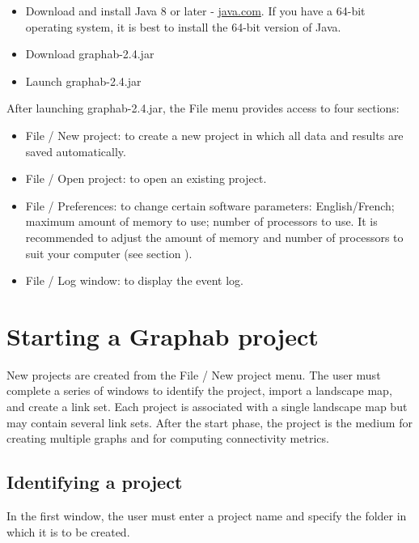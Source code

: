 \documentclass{article}
\begin{document}
\begin{itemize}
	\item Download and install Java 8 or later - \href{http://www.java.com}{java.com}. If you have a 64-bit operating system, it is best to install the 64-bit version of Java.
	\item Download graphab-2.4.jar
	\item Launch graphab-2.4.jar
\end{itemize}
After launching graphab-2.4.jar, the File menu provides access to four sections:
\begin{itemize}
	\item File / New project: to create a new project in which all data and results are saved automatically.  
	\item File / Open project: to open an existing project.
	\item File / Preferences: to change certain software parameters: English/French; maximum amount of memory to use; number of processors to use. It is recommended to adjust the amount of memory and number of processors to suit your computer (see section ).
	\item File / Log window: to display the event log.
\end{itemize}

\section{Starting a Graphab project }

New projects are created from the File / New project menu. The user must complete a series of windows to identify the project, import a landscape map, and create a link set. Each project is associated with a single landscape map but may contain several link sets. After the start phase, the project is the medium for creating multiple graphs and for computing connectivity metrics. 

\subsection{Identifying a project}

In the first window, the user must enter a project name and specify the folder in which it is to be created.
\end{document}

